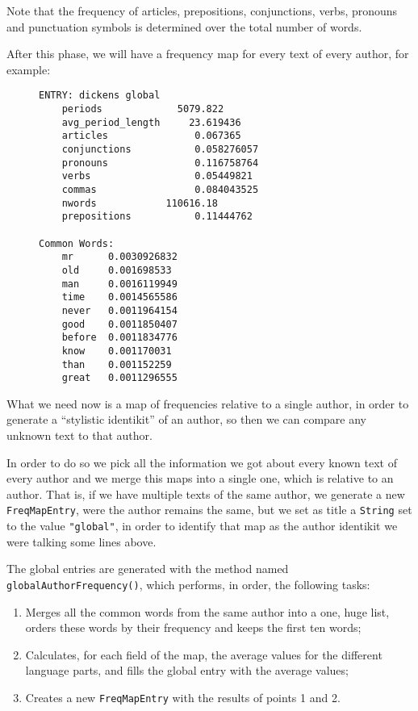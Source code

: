 \documentclass[a4paper,11pt, twoside]{article}
\begin{document}
		\noindent
		Note that the frequency of articles, prepositions, conjunctions, verbs, pronouns and punctuation symbols is determined over the total number of words.
		
		\noindent
		After this phase, we will have a frequency map for every text of every author, for example:

	\begin{figure}[h!]
		\centering
		\begin{BVerbatim}
ENTRY: dickens global
	periods             5079.822
	avg_period_length     23.619436
	articles               0.067365
	conjunctions           0.058276057
	pronouns               0.116758764
	verbs                  0.05449821
	commas                 0.084043525
	nwords            110616.18
	prepositions           0.11444762

Common Words:
	mr      0.0030926832
	old     0.001698533
	man     0.0016119949
	time    0.0014565586
	never   0.0011964154
	good    0.0011850407
	before  0.0011834776
	know    0.001170031
	than    0.001152259
	great   0.0011296555
	\end{BVerbatim}
\end{figure}

		\noindent
		What we need now is a map of frequencies relative to a single author, in order to generate a ``stylistic identikit''  of an author, so then we can compare any unknown text to that author.

		\noindent
		In order to do so we pick all the information we got about every known text of every author and we merge this maps into a single one, which is relative to an author. That is, if we have multiple texts of the same author, we generate a new \lstinline|FreqMapEntry|, were the author remains the same, but we set as title a \lstinline|String| set to the value \lstinline|"global"|, in order to identify that map as the author identikit we were talking some lines above.

		\bigskip
		\noindent
		The global entries are generated with the method named \lstinline|globalAuthorFrequency()|, which performs, in order, the following tasks: \begin{enumerate}
		\item Merges all the common words from the same author into a one, huge list, orders these words by their frequency and keeps the first ten words;
		\item Calculates, for each field of the map, the average values for the different language parts, and fills the global entry with the average values;
		\item Creates a new \lstinline|FreqMapEntry| with the results of points 1 and 2.
		\end{enumerate}
\end{document}
